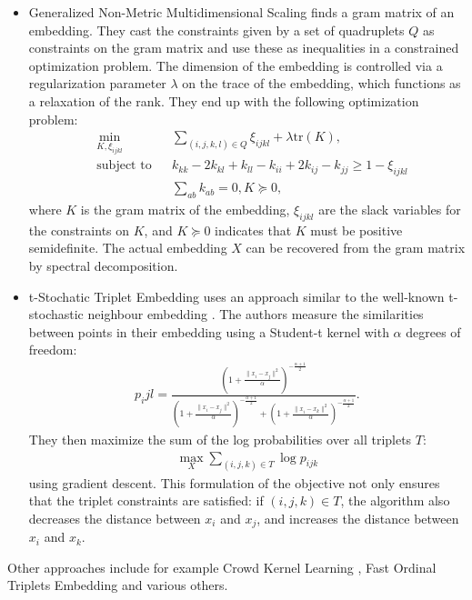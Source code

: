 \begin{itemize}
    \item Generalized Non-Metric Multidimensional Scaling \citep[GNDMS,][]{agarwalGeneralizedNonmetricMultidimensional2007} finds a gram matrix of an embedding. 
        They cast the constraints given by a set of quadruplets $Q$ as constraints on the gram matrix 
        and use these as inequalities in a constrained optimization problem. The dimension
        of the embedding is controlled via a regularization parameter $\lambda$ on
        the trace of the embedding, which functions as a relaxation of the rank. 
        They end up with the following optimization problem:
        \begin{align*}
            &\min_{K, \xi_{ijkl}}          &       & \sum_{(i,j,k,l) \in Q} \xi_{ijkl} + \lambda 
            \text{tr}(K),\\
            &\text{subject to} &       & k_{kk} - 2k_{kl} + k_{ll} - k_{ii} + 2k_{ij} - k_{jj}
            \ge 1 - \xi_{ijkl}\\
            &                  &       & \sum_{ab} k_{ab} = 0, K \succeq 0,
        \end{align*}
        where $K$ is the gram matrix of the embedding, $\xi_{ijkl}$ are the slack variables
        for the constraints on $K$, and $K \succeq 0$ indicates that $K$ must be
        positive semidefinite. The actual embedding $X$ can be recovered from the gram matrix by
        spectral decomposition. 
    \item t-Stochatic Triplet Embedding \citep[t-STE,][]{laurensvandermaatenStochasticTripletEmbedding2012} uses an approach similar to the well-known t-stochastic neighbour embedding 
        \citep[t-SNE,][]{maatenVisualizingDataUsing2008}. 
        The authors measure the similarities between points in their embedding using a Student-t kernel 
        with $\alpha$ degrees of freedom: 
        \begin{align*}
            p_ijl = \frac
            { \left( 1+ \frac{  \|x_i - x_j\|^2 }{\alpha}  \right)^{- \frac{\alpha + 1}{2}}  
            }
            { \left( 1+ \frac{  \|x_i - x_j\|^2 }{\alpha}  \right)^{- \frac{\alpha + 1}{2}} +
              \left( 1+ \frac{  \|x_i - x_k\|^2 }{\alpha}  \right)^{- \frac{\alpha + 1}{2}}  
            }
        .\end{align*}
        They then maximize the sum of the log probabilities over all triplets $T$:
        \begin{align*}
            \max_{X} \sum_{(i,j,k) \in T} \log p_{ijk}
        \end{align*}
        using gradient descent.
        This formulation of the objective not only ensures that the triplet constraints are satisfied: if $(i,j,k) \in T$, the algorithm 
        also decreases the distance between $x_i$ and $x_j$, and increases the distance
        between $x_i$ and $x_k$. 
\end{itemize}
Other approaches include for example 
Crowd Kernel Learning \citep[CKL,][]{tamuzAdaptivelyLearningCrowd2011}, Fast Ordinal Triplets Embedding \citep[FORTE,][]{jainFiniteSamplePrediction2016} and various others. 

